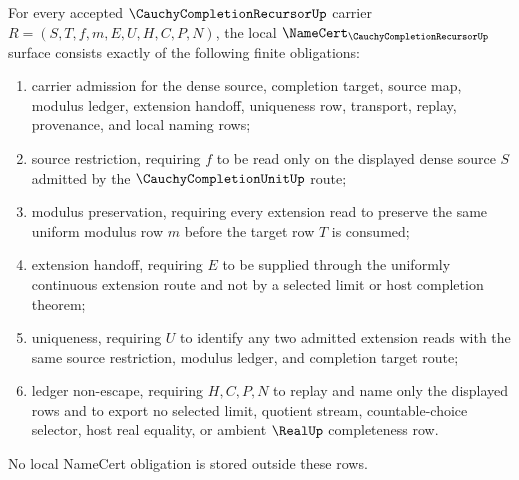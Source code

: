 \begin{theorem}
\label{thm:cauchy-completion-recursor-namecert-obligations}
For every accepted $\CauchyCompletionRecursorUp$ carrier $R=(S,T,f,m,E,U,H,C,P,N)$, the local $\NameCert_{\CauchyCompletionRecursorUp}$ surface consists exactly of the following finite obligations:
\begin{enumerate}
\item carrier admission for the dense source, completion target, source map, modulus ledger, extension handoff, uniqueness row, transport, replay, provenance, and local naming rows;
\item source restriction, requiring $f$ to be read only on the displayed dense source $S$ admitted by the $\CauchyCompletionUnitUp$ route;
\item modulus preservation, requiring every extension read to preserve the same uniform modulus row $m$ before the target row $T$ is consumed;
\item extension handoff, requiring $E$ to be supplied through the uniformly continuous extension route and not by a selected limit or host completion theorem;
\item uniqueness, requiring $U$ to identify any two admitted extension reads with the same source restriction, modulus ledger, and completion target route;
\item ledger non-escape, requiring $H,C,P,N$ to replay and name only the displayed rows and to export no selected limit, quotient stream, countable-choice selector, host real equality, or ambient $\RealUp$ completeness row.
\end{enumerate}
No local NameCert obligation is stored outside these rows.
\end{theorem}
